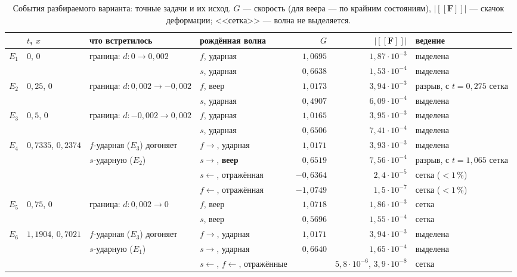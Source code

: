 \documentclass[11pt,a4paper]{article}
\theoremstyle{definition}
\theoremstyle{remark}
\newcommand{\jump}[1]{[\![#1]\!]}
\newcommand{\bF}{\mathbf F}
\begin{document}
\begin{table}[t]
\centering\footnotesize
\setlength{\tabcolsep}{3.5pt}
\caption{События разбираемого варианта: точные задачи и их исход. $G$ --- скорость (для веера ---
по крайним состояниям), $|\jump{\bF}|$ --- скачок деформации; <<сетка>> --- волна не выделяется.}\label{tab:events}
\begin{tabular}{@{}l p{1.75cm} p{3.0cm} p{2.6cm} r r p{2.3cm}@{}}
\toprule
& $t$, $x$ & что встретилось & рождённая волна & $G$ & $|\jump{\bF}|$ & ведение\\
\midrule
$E_1$ & $0$, $0$ & граница: $d\colon 0\to0{,}002$ & $f$, ударная & $1{,}0695$ & $1{,}87\cdot10^{-3}$ & выделена\\
      &          &                               & $s$, ударная & $0{,}6638$ & $1{,}53\cdot10^{-4}$ & выделена\\
$E_2$ & $0{,}25$, $0$ & граница: $d\colon 0{,}002\to-0{,}002$ & $f$, веер & $1{,}0173$ & $3{,}94\cdot10^{-3}$ & разрыв, с $t=0{,}275$ сетка\\
      &          &                               & $s$, ударная & $0{,}4907$ & $6{,}09\cdot10^{-4}$ & выделена\\
$E_3$ & $0{,}5$, $0$ & граница: $d\colon -0{,}002\to0{,}002$ & $f$, ударная & $1{,}0165$ & $3{,}95\cdot10^{-3}$ & выделена\\
      &          &                               & $s$, ударная & $0{,}6506$ & $7{,}41\cdot10^{-4}$ & выделена\\
$E_4$ & $0{,}7335$, $0{,}2374$ & $f$-ударная ($E_3$) догоняет & $f\to$, ударная & $1{,}0171$ & $3{,}93\cdot10^{-3}$ & выделена\\
      &          & $s$-ударную ($E_2$)           & $s\to$, \textbf{веер} & $0{,}6519$ & $7{,}56\cdot10^{-4}$ & разрыв, с $t=1{,}065$ сетка\\
      &          &                               & $s\leftarrow$, отражённая & $-0{,}6364$ & $2{,}4\cdot10^{-5}$ & сетка ($<1\,\%$)\\
      &          &                               & $f\leftarrow$, отражённая & $-1{,}0749$ & $1{,}5\cdot10^{-7}$ & сетка ($<1\,\%$)\\
$E_5$ & $0{,}75$, $0$ & граница: $d\colon 0{,}002\to0$ & $f$, веер & $1{,}0718$ & $1{,}86\cdot10^{-3}$ & сетка\\
      &          &                               & $s$, веер & $0{,}5696$ & $1{,}55\cdot10^{-4}$ & сетка\\
$E_6$ & $1{,}1904$, $0{,}7021$ & $f$-ударная ($E_3$) догоняет & $f\to$, ударная & $1{,}0171$ & $3{,}94\cdot10^{-3}$ & выделена\\
      &          & $s$-ударную ($E_1$)           & $s\to$, ударная & $0{,}6640$ & $1{,}65\cdot10^{-4}$ & выделена\\
      &          &                               & $s\leftarrow$, $f\leftarrow$, отражённые & & $5{,}8\cdot10^{-6}$, $3{,}9\cdot10^{-8}$ & сетка\\
\bottomrule
\end{tabular}
\end{table}
\end{document}
